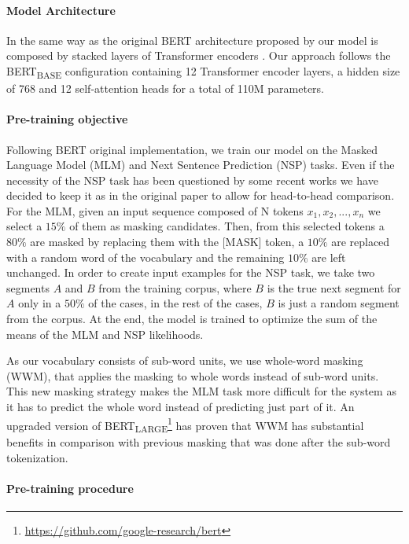 \documentclass[10pt, a4paper]{article}
\begin{document}
\paragraph{Model Architecture}

In the same way as the original BERT architecture proposed by  our model is composed by stacked layers of Transformer encoders \cite{vaswani2017attention}. Our approach follows the BERT\textsubscript{BASE} configuration containing 12 Transformer encoder layers, a hidden size of 768 and 12 self-attention heads for a total of 110M parameters.

\paragraph{Pre-training objective}

Following BERT original implementation, we train our model on the Masked Language Model (MLM) and Next Sentence Prediction (NSP) tasks. Even if the necessity of the NSP task has been questioned by some recent works \cite{yang2019xlnet,liu2019roberta,lample2019cross} we have decided to keep it as in the original paper to allow for head-to-head comparison. For the MLM, given an input sequence composed of N tokens $x_1, x_2, ..., x_n$ we select a $15\%$ of them as masking candidates. Then, from this selected tokens a $80\%$ are masked by replacing them with the [MASK] token, a $10\%$ are replaced with a random word of the vocabulary and the remaining $10\%$ are left unchanged. In order to create input examples for the NSP task, we take two segments $A$ and $B$ from the training corpus, where $B$ is the true next segment for $A$ only in a $50\%$ of the cases, in the rest of the cases, $B$ is just a random segment from the corpus. At the end, the model is trained to optimize the sum of the means of the MLM and NSP likelihoods.

As our vocabulary consists of sub-word units, we use whole-word masking (WWM), that applies the masking to whole words instead of sub-word units. This new masking strategy makes the MLM task more difficult for the system as it has to predict the whole word instead of predicting just part of it. An upgraded version of BERT\textsubscript{LARGE}\footnote{\scriptsize{\url{https://github.com/google-research/bert}}} has proven that WWM has substantial benefits in comparison with previous masking that was done after the sub-word tokenization.

\paragraph{Pre-training procedure}
\end{document}
